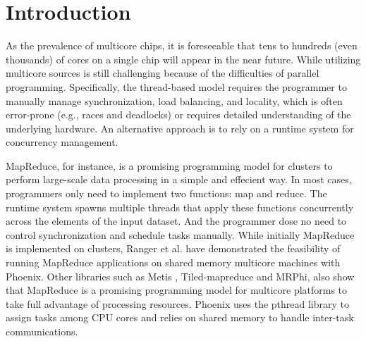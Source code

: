\section{Introduction}
\label{sec:intro}



As the prevalence of multicore chips,
it is foreseeable that tens to hundreds (even thousands) of cores on a single chip
will appear in the near future\cite{Borkar2007core}.
While utilizing multicore sources is still challenging
because of the difficulties of parallel programming.
Specifically, the thread-based model requires the programmer to manually
manage synchronization, load balancing, and locality, which is
often error-prone (e.g., races and deadlocks) or requires detailed
understanding of the underlying hardware.
An alternative approach is to rely on a runtime system for
concurrency management. 

MapReduce\cite{dean2004mapreduce}, 
for instance, is a promising programming model for clusters
to perform large-scale data processing
in a simple and effecient way.
In most cases, programmers only need to implement two functions:
map and reduce.
The runtime system spawns multiple threads that apply
these functions concurrently across the elements of the input
dataset. 
And the programmer dose no need to control synchronization 
and schedule tasks manually.
While initially MapReduce is implemented on clusters, Ranger
et al. have demonstrated the feasibility of running MapReduce
applications on shared memory multicore machines with 
Phoenix\cite{ranger2007phoenix}.
Other libraries such as Metis\cite{mao2010metis} 
, Tiled-mapreduce\cite{chen2010tiled} and MRPhi\cite{lu2013mrphi}, 
also show that MapReduce is a promising programming model 
for multicore platforms to take full advantage of  
processing resources.
Phoenix uses the pthread library to assign tasks 
among CPU cores and relies on
shared memory to handle inter-task communications.

